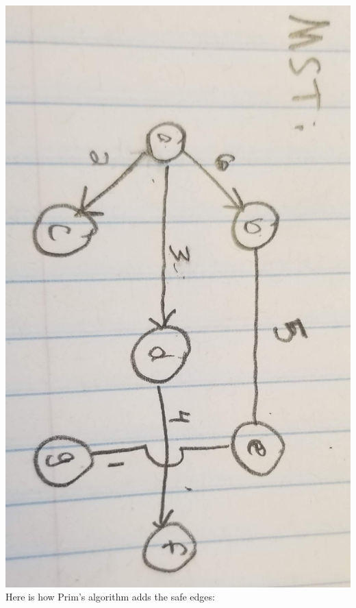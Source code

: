 \documentclass[12pt]{article}
\begin{document}
\begin{enumerate}
\includegraphics[scale=0.05]{problem3pic3.png}
\pagebreak
\\
Here is how Prim's algorithm adds the safe edges:\\
\\

\end{enumerate}
\end{document}
